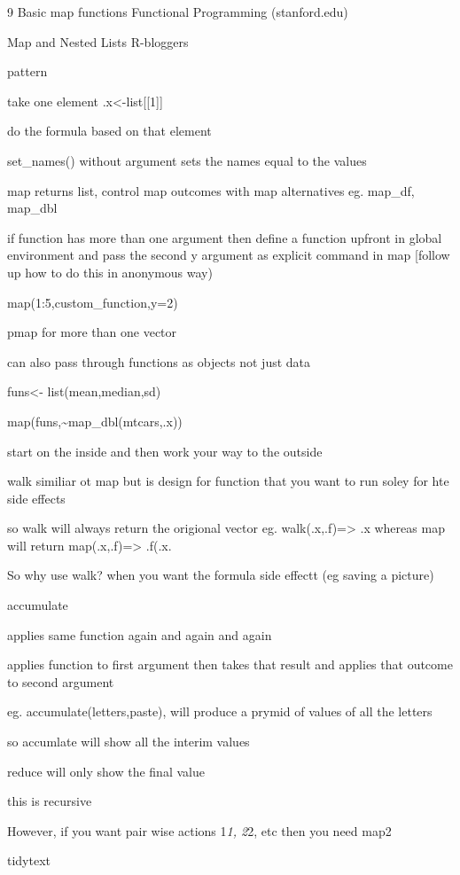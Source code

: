 \documentclass[
  letterpaper,
  DIV=11,
  numbers=noendperiod]{scrreprt}
\begin{document}
9 Basic map functions \textbar{} Functional Programming (stanford.edu)

Map and Nested Lists \textbar{} R-bloggers

pattern

take one element .x\textless-list{[}{[}1{]}{]}

do the formula based on that element

set\_names() without argument sets the names equal to the values

map returns list, control map outcomes with map alternatives eg.
map\_df, map\_dbl

if function has more than one argument then define a function upfront in
global environment and pass the second y argument as explicit command in
map {[}follow up how to do this in anonymous way)

map(1:5,custom\_function,y=2)

pmap for more than one vector

can also pass through functions as objects not just data

funs\textless- list(mean,median,sd)

map(funs,\textasciitilde map\_dbl(mtcars,.x))

start on the inside and then work your way to the outside

walk similiar ot map but is design for function that you want to run
soley for hte side effects

so walk will always return the origional vector eg.
walk(.x,.f)=\textgreater{} .x whereas map will return
map(.x,.f)=\textgreater{} .f(.x.

So why use walk? when you want the formula side effectt (eg saving a
picture)

accumulate

applies same function again and again and again

applies function to first argument then takes that result and applies
that outcome to second argument

eg. accumulate(letters,paste), will produce a prymid of values of all
the letters

so accumlate will show all the interim values

reduce will only show the final value

this is recursive

However, if you want pair wise actions 1\emph{1, 2}2, etc then you need
map2

tidytext
\end{document}

